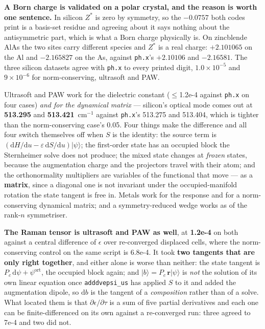 \documentclass[11pt,a4paper]{article}
\newcommand{\code}[1]{\texttt{\small #1}}
\begin{document}
\textbf{A Born charge is validated on a polar crystal, and the reason is worth
one sentence.} In silicon $Z^{\ast}$ is zero by symmetry, so the $-0.0757$ both
codes print is a basis-set residue and agreeing about it says nothing about the
antisymmetric part, which is what a Born charge physically is. On zincblende
AlAs the two sites carry different species and $Z^{\ast}$ is a real charge:
$+2.101065$ on the Al and $-2.165827$ on the As, against \code{ph.x}'s
$+2.10106$ and $-2.16581$. The three silicon datasets agree with \code{ph.x} to
every printed digit, $1.0\times10^{-5}$ and $9\times10^{-6}$ for
norm-conserving, ultrasoft and PAW.

Ultrasoft and PAW work for the dielectric constant ($\le$1.2e-4 against
\code{ph.x} on four cases) \emph{and for the dynamical matrix} --- silicon's
optical mode comes out at \textbf{513.295} and \textbf{513.421}~cm$^{-1}$
against \code{ph.x}'s 513.275 and 513.404, which is tighter than the
norm-conserving case's 0.05. Four things make the difference and all four
switch themselves off when $S$ is the identity: the source term is
$(\mathrm{d}H/\mathrm{d}u - \varepsilon\,\mathrm{d}S/\mathrm{d}u)|\psi\rangle$;
the first-order state has an occupied block the Sternheimer solve does not
produce; the mixed state changes at \emph{frozen} states, because the
augmentation charge and the projectors travel with their atom; and the
orthonormality multipliers are variables of the functional that move --- as a
\textbf{matrix}, since a diagonal one is not invariant under the
occupied-manifold rotation the state tangent is free in. Metals work for the
response and for a norm-conserving dynamical matrix; and a symmetry-reduced
wedge works as of the rank-$n$ symmetriser.

\textbf{The Raman tensor is ultrasoft and PAW as well}, at \textbf{1.2e-4} on
both against a central difference of $\epsilon$ over re-converged displaced
cells, where the norm-conserving control on the same script is 6.8e-4. It took
\textbf{two tangents that are only right together}, and either alone is worse
than neither: the state tangent is $P_c\,\mathrm{d}\psi + \psi^{\mathrm{ort}}$,
the occupied block again; and $|b\rangle = P_c\,\mathbf r|\psi\rangle$ is
\emph{not} the solution of its own linear equation once \code{adddvepsi\_us}
has applied $S$ to it and added the augmentation dipole, so $\mathrm{d}b$ is
the tangent of a \emph{composition} rather than of a solve. What located them
is that $\partial\epsilon/\partial\tau$ is a sum of five partial derivatives
and each one can be finite-differenced on its own against a re-converged run:
three agreed to 7e-4 and two did not.
\end{document}
